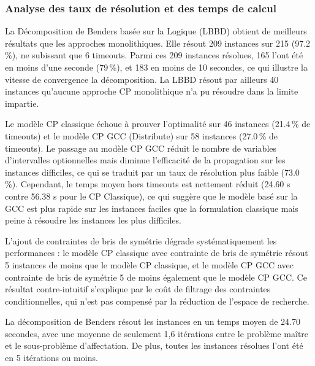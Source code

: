 \subsubsection{Analyse des taux de résolution et des temps de calcul}
La Décomposition de Benders basée sur la Logique (LBBD) obtient de meilleurs résultats que les approches monolithiques. Elle résout 209 instances sur 215 (97.2\,\%), ne subissant que 6 timeouts. Parmi ces 209 instances résolues, 165 l'ont été en moins d'une seconde (79\,\%), et 183 en moins de 10 secondes, ce qui illustre la vitesse de convergence la décomposition. La LBBD résout par ailleurs 40 instances qu'aucune approche CP monolithique n'a pu résoudre dans la limite impartie.

Le modèle CP classique échoue à prouver l'optimalité sur 46 instances (21.4\,\% de timeouts) et le modèle CP GCC (Distribute) sur 58 instances (27.0\,\% de timeouts). Le passage au modèle CP GCC réduit le nombre de variables d'intervalles optionnelles mais diminue l'efficacité de la propagation sur les instances difficiles, ce qui se traduit par un taux de résolution plus faible (73.0\,\%). Cependant, le temps moyen hors timeouts est nettement réduit (24.60 s contre 56.38 s pour le CP Classique), ce qui suggère que le modèle basé sur la GCC est plus rapide sur les instances faciles que la formulation classique mais peine à résoudre les instances les plus difficiles.

L'ajout de contraintes de bris de symétrie dégrade systématiquement les performances : le modèle CP classique avec contrainte de bris de symétrie résout 5 instances de moins que le modèle CP classique, et le modèle CP GCC avec contrainte de bris de symétrie 5 de moins également que le modèle CP GCC. Ce résultat contre-intuitif s'explique par le coût de filtrage des contraintes conditionnelles, qui n'est pas compensé par la réduction de l'espace de recherche.

La décomposition de Benders résout les instances en un temps moyen de 24.70 secondes, avec une moyenne de seulement 1,6 itérations entre le problème maître et le sous-problème d'affectation. De plus, toutes les instances résolues l'ont été en 5 itérations ou moins.

